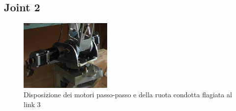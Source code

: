 \documentclass[%
corpo=11pt,
twoside,
 stile=classica,
oldstyle,
greek,%
]{toptesi}
\begin{document}
	
	
		\subsection{Joint 2}
		\begin{figure}
			\centering
			\includegraphics[width=0.4\textwidth]{image/basefoto.png}
			\caption{Disposizione dei motori passo-passo e della ruota condotta flagiata al link 3}
			\label{fig:Stepper_foto}
		\end{figure}
	
\end{document}
